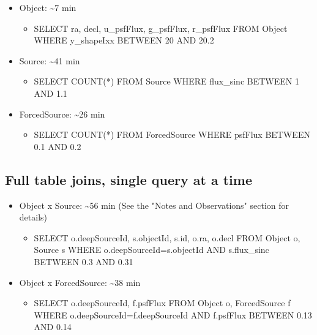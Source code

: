 \documentclass[DM,toc]{lsstdoc}
\begin{document}
\begin{itemize}
\item
  Object: \textasciitilde{}7 min

  \begin{itemize}
  \item
    SELECT ra, decl, u\_psfFlux, g\_psfFlux, r\_psfFlux FROM Object
    WHERE y\_shapeIxx BETWEEN 20 AND 20.2
  \end{itemize}
\item
  Source: \textasciitilde{}41 min

  \begin{itemize}
  \item
    SELECT COUNT(*) FROM Source WHERE flux\_sinc BETWEEN 1 AND 1.1
  \end{itemize}
\item
  ForcedSource: \textasciitilde{}26 min

  \begin{itemize}
  \item
    SELECT COUNT(*) FROM ForcedSource WHERE psfFlux BETWEEN 0.1 AND 0.2
  \end{itemize}
\end{itemize}

\subsection{\texorpdfstring{\textbf{Full table joins, single query at
a
time}}{Full table joins, single query at a time}}\label{full-table-joins-single-query-at-a-time}

\begin{itemize}
\item
  Object x Source: \textasciitilde{}56 min (See the "Notes and
  Observations" section for details)

  \begin{itemize}
  \item
    SELECT o.deepSourceId, s.objectId, s.id, o.ra, o.decl FROM Object o,
    Source s WHERE o.deepSourceId=s.objectId AND s.flux\_sinc BETWEEN
    0.3 AND 0.31
  \end{itemize}
\item
  Object x ForcedSource: \textasciitilde{}38 min

  \begin{itemize}
  \item
    SELECT o.deepSourceId, f.psfFlux FROM Object o, ForcedSource f WHERE
    o.deepSourceId=f.deepSourceId AND f.psfFlux BETWEEN 0.13 AND 0.14
  \end{itemize}
\end{itemize}
\end{document}
